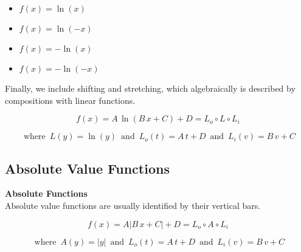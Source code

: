 \documentclass{ximera}
\begin{document}
\begin{template}
\begin{itemize}
\item $f(x) = \ln(x)$ 
\item $f(x) = \ln(-x)$ 
\item $f(x) = -\ln(x)$ 
\item $f(x) = -\ln(-x)$ 
\end{itemize}






Finally, we include shifting and stretching, which algebraically is described by compositions with linear functions.


\[ f(x) = A \, \ln(B \, x + C) + D = L_o \circ L \circ L_i\]

\[
\text{ where } \,   L(y) = \ln(y)   \,  \text{ and } \,    L_o(t) = A \, t + D    \,  \text{ and } \,   L_i(v) = B \, v + C
\]








\end{template}





















\subsection*{Absolute Value Functions}








\begin{template}  \textbf{\textcolor{blue!55!black}{Absolute Functions}} \\



Absolute value functions are usually identified by their vertical bars.





\[ f(x) = A | B \, x + C | + D = L_o \circ A \circ L_i\]

\[
\text{ where } \,  A(y) = | y |  \,  \text{ and } \,    L_o(t) = A \, t + D    \,  \text{ and } \,   L_i(v) = B \, v + C
\]







\end{template}
\end{document}
